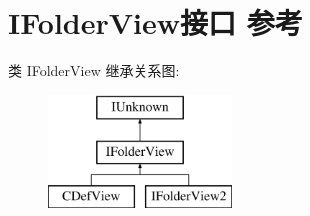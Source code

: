 \hypertarget{interface_i_folder_view}{}\section{I\+Folder\+View接口 参考}
\label{interface_i_folder_view}
类 I\+Folder\+View 继承关系图\+:\begin{figure}[H]
\begin{center}
\leavevmode
\includegraphics[height=3.000000cm]{interface_i_folder_view}
\end{center}
\end{figure}
